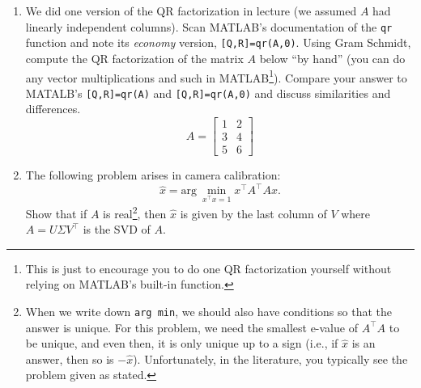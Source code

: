 \documentclass[letterpaper]{article}
\begin{document}
\begin{enumerate}
\begin{enumerate}
\end{enumerate}

\textbf{Remark:} A QP is an optimization problem of the form $$\widehat{x}:= \underset{ \begin{array}{l} A_{eq} x=b_{eq} \\A_{in} x \le b_{in} \end{array} } { \mathrm{arg}~\min}||x||^2.$$ The key addition is that inequality constraints, $A_{in} x \le b_{in}, $ can also be included. We'll talk more about this the last day of lecture.

\item  We did one version of the QR factorization in lecture (we assumed $A$ had linearly independent columns). Scan MATLAB's documentation of the \texttt{qr} function and note its \textit{economy} version, \texttt{[Q,R]=qr(A,0)}. Using Gram Schmidt, compute the QR factorization of the matrix $A$ below ``by hand'' (you can do any vector multiplications and such in MATLAB\footnote{This is just to encourage you to do one QR factorization yourself without relying on MATLAB's built-in function.}). Compare your answer to MATALB's \texttt{[Q,R]=qr(A)} and  \texttt{[Q,R]=qr(A,0)} and discuss similarities and differences.
    $$ A=\left[ \begin{array}{rr}  1&   2 \\   3 &  4 \\  5&   6\end{array} \right]$$

%


\item The following problem arises in camera calibration: $$\widehat{x} = \text{arg}~\min_{x^\top x=1} x^\top A^\top A x.$$ Show that if $A$ is real\footnote{When we write down \texttt{arg~min}, we should also have conditions so that the answer is unique. For this problem, we need the smallest e-value of $A^\top A$ to be unique, and even then, it is only unique up to a sign (i.e., if $\widehat{x}$ is an answer, then so is $-\widehat{x}$). Unfortunately, in the literature, you typically see the problem given as stated.}, then $\widehat{x}$ is given by the last column of $V$ where $A=U \Sigma V^\top$ is the SVD of $A$.



\end{enumerate}
\end{document}
